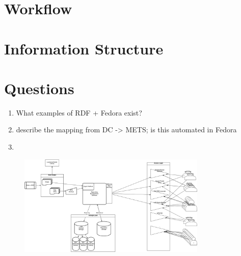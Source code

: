 \documentclass[oneside, 12pt]{article}
\begin{document}
%

\section{Workflow}



\section{Information Structure}


\section{Questions}
\begin{enumerate}
  \item{What examples of RDF + Fedora exist?}
  \item{describe the mapping from DC -> METS; is this automated in Fedora}
  \item{}
\end{enumerate}

\begin{figure}[H]
  \centering
  \includegraphics[width=0.8\textwidth]{apc-01.png}
\end{figure}


\end{document}
